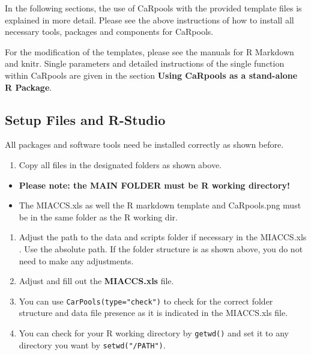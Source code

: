 \documentclass[]{article}
\providecommand{\tightlist}{%
  \setlength{\itemsep}{0pt}\setlength{\parskip}{0pt}}
\begin{document}
In the following sections, the use of CaRpools with the provided
template files is explained in more detail. Please see the above
instructions of how to install all necessary tools, packages and
components for CaRpools.

For the modification of the templates, please see the manuals for R
Markdown and knitr. Single parameters and detailed instructions of the
single function within CaRpools are given in the section \textbf{Using
CaRpools as a stand-alone R Package}.

\subsection{Setup Files and R-Studio}\label{setup-files-and-r-studio}

All packages and software tools need be installed correctly as shown
before.

\begin{enumerate}
\def\labelenumi{\arabic{enumi}.}
\tightlist
\item
  Copy all files in the designated folders as shown above.
\end{enumerate}

\begin{itemize}
\tightlist
\item
  \textbf{Please note: the MAIN FOLDER must be R working directory!}
\item
  The MIACCS.xls as well the R markdown template and CaRpools.png must
  be in the same folder as the R working dir.
\end{itemize}

\begin{enumerate}
\def\labelenumi{\arabic{enumi}.}
\setcounter{enumi}{1}
\tightlist
\item
  Adjust the path to the data and scripts folder if necessary in the
  MIACCS.xls . Use the absolute path. If the folder structure is as
  shown above, you do not need to make any adjustments.
\item
  Adjust and fill out the \textbf{MIACCS.xls} file.
\item
  You can use \texttt{CarPools(type="check")} to check for the correct
  folder structure and data file presence as it is indicated in the
  MIACCS.xls file.
\item
  You can check for your R working directory by \texttt{getwd()} and set
  it to any directory you want by \texttt{setwd("/PATH")}.
\end{enumerate}
\end{document}
